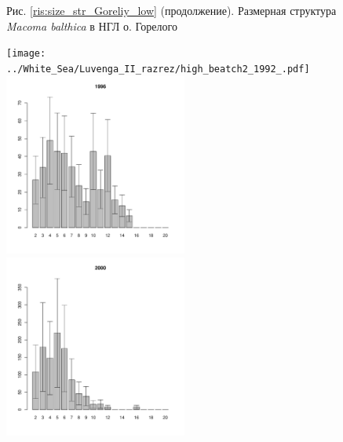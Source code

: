 \documentclass[12pt, a4paper]{article}
\begin{document}
\begin{figure}[h]


\begin{center}
Рис. \ref{ris:size_str_Goreliy_low} (продолжение). Размерная структура {\it Macoma balthica} в НГЛ о. Горелого

\end{center}
\end{figure}



\newpage \begin{figure}[h] 

\begin{multicols}{3}
\hfill
\texttt{[image: ../White\_Sea/Luvenga\_II\_razrez/high\_beatch2\_1992\_.pdf]}
\hfill
\includegraphics[width=60mm]{../White_Sea/Luvenga_II_razrez/high_beatch2_1996_.pdf}
\hfill
\includegraphics[width=60mm]{../White_Sea/Luvenga_II_razrez/high_beatch2_2000_.pdf}
\end{multicols}




\end{figure}
\end{document}
